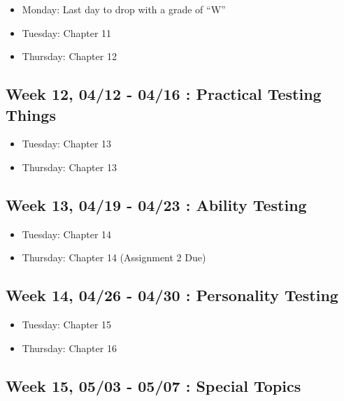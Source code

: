 \documentclass[11pt,]{article}
\providecommand{\tightlist}{%
  \setlength{\itemsep}{0pt}\setlength{\parskip}{0pt}}
\begin{document}
\begin{itemize}
\tightlist
\item
  Monday: Last day to drop with a grade of ``W''
\item
  Tuesday: Chapter 11
\item
  Thursday: Chapter 12
\end{itemize}

\hypertarget{week-12-0412---0416-practical-testing-things}{%
\subsection{Week 12, 04/12 - 04/16 : Practical Testing
Things}\label{week-12-0412---0416-practical-testing-things}}

\begin{itemize}
\tightlist
\item
  Tuesday: Chapter 13
\item
  Thursday: Chapter 13
\end{itemize}

\hypertarget{week-13-0419---0423-ability-testing}{%
\subsection{Week 13, 04/19 - 04/23 : Ability
Testing}\label{week-13-0419---0423-ability-testing}}

\begin{itemize}
\tightlist
\item
  Tuesday: Chapter 14
\item
  Thursday: Chapter 14 (Assignment 2 Due)
\end{itemize}

\hypertarget{week-14-0426---0430-personality-testing}{%
\subsection{Week 14, 04/26 - 04/30 : Personality
Testing}\label{week-14-0426---0430-personality-testing}}

\begin{itemize}
\tightlist
\item
  Tuesday: Chapter 15
\item
  Thursday: Chapter 16
\end{itemize}

\hypertarget{week-15-0503---0507-special-topics}{%
\subsection{Week 15, 05/03 - 05/07 : Special
Topics}\label{week-15-0503---0507-special-topics}}
\end{document}
